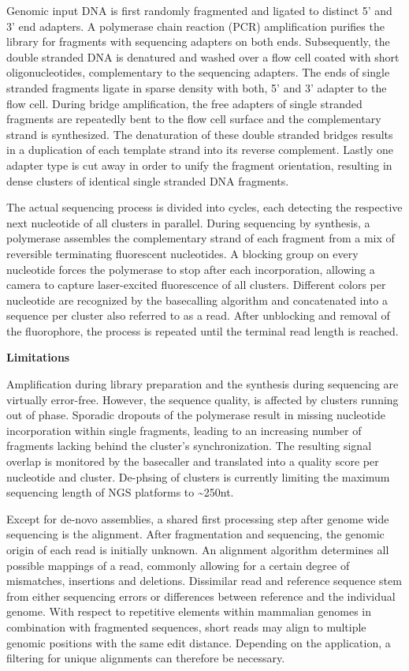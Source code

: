 Genomic input DNA is first randomly fragmented and ligated to distinct 5' and 3' end adapters.
A polymerase chain reaction (PCR) amplification purifies the library for fragments with sequencing adapters on both ends.
Subsequently, the double stranded DNA is denatured and washed over a flow cell coated with short oligonucleotides, complementary to the sequencing adapters.
The ends of single stranded fragments ligate in sparse density with both, 5' and 3' adapter to the flow cell.
During bridge amplification, the free adapters of single stranded fragments are repeatedly bent to the flow cell surface and the complementary strand is synthesized. 
The denaturation of these double stranded bridges results in a duplication of each template strand into its reverse complement.
Lastly one adapter type is cut away in order to unify the fragment orientation, resulting in dense clusters of identical single stranded DNA fragments.

The actual sequencing process is divided into cycles, each detecting the respective next nucleotide of all clusters in parallel.
During sequencing by synthesis, a polymerase assembles the complementary strand of each fragment from a mix of reversible terminating fluorescent nucleotides.
A blocking group on every nucleotide forces the polymerase to stop after each incorporation, allowing a camera to capture laser-excited fluorescence of all clusters.
Different colors per nucleotide are recognized by the basecalling algorithm and concatenated into a sequence per cluster also referred to as a read.
After unblocking and removal of the fluorophore, the process is repeated until the terminal read length is reached.

\textbf{Limitations}

Amplification during library preparation and the synthesis during sequencing are virtually error-free.
However, the sequence quality, is affected by clusters running out of phase. 
Sporadic dropouts of the polymerase result in missing nucleotide incorporation within single fragments, leading to an increasing number of fragments lacking behind the cluster's synchronization.
The resulting signal overlap is monitored by the basecaller and translated into a quality score per nucleotide and cluster.
De-phsing of clusters is currently limiting the maximum sequencing length of NGS platforms to \textasciitilde250nt.

Except for de-novo assemblies, a shared first processing step after genome wide sequencing is the alignment.
After fragmentation and sequencing, the genomic origin of each read is initially unknown.
An alignment algorithm determines all possible mappings of a read, commonly allowing for a certain degree of mismatches, insertions and deletions.
Dissimilar read and reference sequence stem from either sequencing errors or differences between reference and the individual genome.
With respect to repetitive elements within mammalian genomes in combination with fragmented sequences, short reads may align to multiple genomic positions with the same edit distance.
Depending on the application, a filtering for unique alignments can therefore be necessary.

